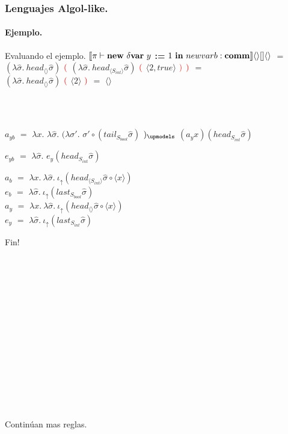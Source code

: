 \documentclass{beamer} %
\newcommand{\semBrcks}[1]{\llbracket #1 \rrbracket}
\newcommand{\angles}[1]{\langle #1 \rangle}
\newcommand{\deltavar}{\delta \bf{var}}
\newcommand{\comm}{\bf{comm}}
\newcommand{\newdeltavar}[3]{{\bf new \ \deltavar} \ #1 \ ${\bf :=}$ \ #2 \ {\bf in} \ #3}
\newcommand{\denotalsem}[5]{\semBrcks{#1 \vdash #2} #3 #4 #5}
\newcommand{\iotabot}{\iota_{\uparrow}}
\newcommand{\sigmah}{\widehat{\sigma}}
\begin{document}
\begin{frame}
\frametitle{Lenguajes Algol-like.}
\framesubtitle{Ejemplo.}

\begin{block}{Evaluando el ejemplo.}
$\denotalsem{\pi}{\newdeltavar{y}{1}{newvarb}:\comm}{\angles{}}{[]}{\angles{}}$ $=$
$(\lambda \sigmah . \ head_{\angles{}}\sigmah)$ $\textcolor{red}{(}$ $(\lambda \sigmah . \ head_{\angles{S_{int}}} \sigmah)$ $\textcolor{red}{(}$ \pause $\angles{2, true}$
$\textcolor{red}{)}$ $\textcolor{red}{)}$ $=$\\ \pause
$(\lambda \sigmah . \ head_{\angles{}}\sigmah)$ $\textcolor{red}{(}$ $\angles{2}$ $\textcolor{red}{)}$ $=$ \pause $\angles{}$\\

\

\


$a_{yb}$ $=$ $\lambda x.$ $\lambda \sigmah .$ $(\lambda \sigma' .$ $\sigma' \circ (tail_{S_{bool}}\sigmah)$ $)_{\upmodels}$ $(a_y x)(head_{S_{int}}\sigmah)$

$e_{yb}$ $=$ $\lambda \sigmah .$ $e_y(head_{S_{int}}\sigmah)$

$a_b$ $=$ $\lambda x. \ \lambda \sigmah . \ \iotabot(head_{\angles{S_{int}}}\sigmah \circ \angles{x})$\\
$e_b$ $=$ $\lambda \sigmah . \ \iotabot(last_{S_{bool}}\sigmah)$\\

$a_y$ $=$ $\lambda x. \ \lambda \sigmah . \ \iotabot(head_{\angles{}}\sigmah \circ \angles{x})$\\
$e_y$ $=$ $\lambda \sigmah . \ \iotabot(last_{S_{int}}\sigmah)$
\end{block}

\end{frame}

\begin{frame}
\begin{center}\Huge
Fin!
\end{center}
\

\

\

\

\

\

\

\

{\tiny Contin\'uan mas reglas.}
\end{frame}
\end{document}
